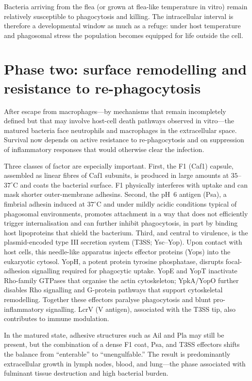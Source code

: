 \documentclass[11pt,a4paper]{article}
\begin{document}
Bacteria arriving from the flea (or grown at flea-like temperature in vitro) remain relatively susceptible to phagocytosis and killing. The intracellular interval is therefore a developmental window as much as a refuge: under host temperature and phagosomal stress the population becomes equipped for life outside the cell.

\section{Phase two: surface remodelling and resistance to re-phagocytosis}

After escape from macrophages---by mechanisms that remain incompletely defined but that may involve host-cell death pathways observed in vitro---the matured bacteria face neutrophils and macrophages in the extracellular space. Survival now depends on active resistance to re-phagocytosis and on suppression of inflammatory responses that would otherwise clear the infection.

Three classes of factor are especially important. First, the F1 (Caf1) capsule, assembled as linear fibres of Caf1 subunits, is produced in large amounts at $35$--$37^\circ\mathrm{C}$ and coats the bacterial surface. F1 physically interferes with uptake and can mask shorter outer-membrane adhesins. Second, the pH~6 antigen (Psa), a fimbrial adhesin induced at $37^\circ\mathrm{C}$ and under mildly acidic conditions typical of phagosomal environments, promotes attachment in a way that does not efficiently trigger internalisation and can further inhibit phagocytosis, in part by binding host lipoproteins that shield the bacterium. Third, and central to virulence, is the plasmid-encoded type III secretion system (T3SS; Ysc--Yop). Upon contact with host cells, this needle-like apparatus injects effector proteins (Yops) into the eukaryotic cytosol. YopH, a potent protein tyrosine phosphatase, disrupts focal-adhesion signalling required for phagocytic uptake. YopE and YopT inactivate Rho-family GTPases that organise the actin cytoskeleton; YpkA/YopO further disables Rho signalling and G-protein pathways that support cytoskeletal remodelling. Together these effectors paralyse phagocytosis and blunt pro-inflammatory signalling. LcrV (V antigen), associated with the T3SS tip, also contributes to immune modulation.

In the matured state, adhesive structures such as Ail and Pla may still be present, but the combination of a dense F1 coat, Psa, and T3SS effectors shifts the balance from ``enterable'' to ``unengulfable.'' The result is predominantly extracellular growth in lymph nodes, blood, and lung---the phase associated with fulminant tissue destruction and high bacterial burden.
\end{document}

